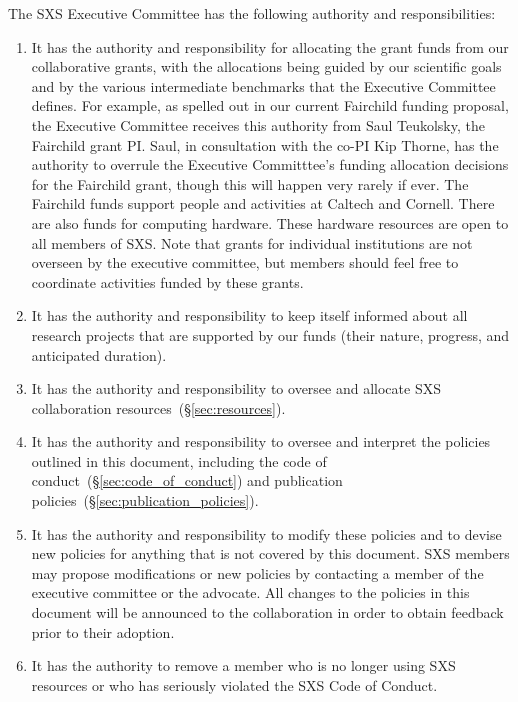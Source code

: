 \documentclass[12pt]{article}
\begin{document}
The SXS Executive Committee has the following authority and
  responsibilities:
\begin{enumerate}
\setlength\itemsep{-0.25em}
\item It has the authority and responsibility for allocating the grant
  funds from our collaborative grants, with the allocations being
  guided by our scientific goals and by the various intermediate
  benchmarks that the Executive Committee defines.  For example, as
  spelled out in our current Fairchild funding proposal, the Executive
  Committee receives this authority from Saul Teukolsky, the Fairchild
  grant PI.  Saul, in consultation with the co-PI Kip Thorne, has the
  authority to overrule the Executive Committtee's funding allocation
  decisions for the Fairchild grant, though this will happen very
  rarely if ever.  The Fairchild funds support people and activities
  at Caltech and Cornell.  There are also funds for computing
  hardware. These hardware resources are open to all members of SXS.
  Note that grants for individual institutions are not overseen by the
  executive committee, but members should feel free to coordinate
  activities funded by these grants.
\item It has the authority and responsibility to keep itself informed
  about all research projects that are supported by our funds (their
  nature, progress, and anticipated duration).
\item It has the authority and responsibility to oversee and allocate
  SXS collaboration resources~(\S\ref{sec:resources}).
\item It has the authority and responsibility to oversee and interpret
  the policies outlined in this document, including the code of
  conduct~(\S\ref{sec:code_of_conduct}) and publication
  policies~(\S\ref{sec:publication_policies}).
\item It has the authority and responsibility to modify these policies
  and to devise new policies for anything that is not covered by this
  document.  SXS members may propose modifications or new policies by
  contacting a member of the executive committee or the advocate.  All
  changes to the policies in this document will be announced to the
  collaboration in order to obtain feedback prior to their adoption.
\item It has the authority to remove a member who is no longer using
  SXS resources or who has seriously violated the SXS Code of Conduct.
\end{enumerate}
\end{document}
